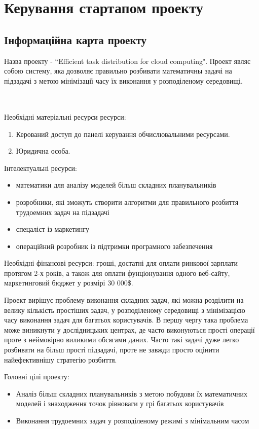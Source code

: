 \chapter{Керування стартапом проекту}
\section{Інформаційна карта проекту}
Назва проекту - ``Efficient task distribution for cloud computing". Проект являє собою систему, яка дозволяє правильно розбивати математичны задачі на підзадачі з метою мінімізації часу їх виконання у розподіленому середовищі.
\begin{tabular}
  {|l|p{8cm}|}
\hline

\end{tabular}
\\
Необхідні матеріальні ресурси ресурси:
\begin{enumerate}
\item Керований доступ до панелі керування обчислювальними ресурсами.
\item Юридична особа.
\end{enumerate}
Інтелектуальні ресурси:
\begin{itemize}
  \item математики для аналізу моделей більш складних планувальників
  \item розробники, які зможуть створити алгоритми для правильного розбиття трудоемних задач на підзадачі
  \item спецаліст із маркетингу
  \item операційний розробник із підтримки програмного забезпечення
\end{itemize}
Необхідні фінансові ресурси: гроші, достатні для оплати ринкової зарплати протягом 2-х років, а також для оплати фунціонування одного веб-сайту, маркетинговий бюджет у розмірі 30 000\$.

Проект вирішує проблему виконання складних задач, які можна розділити на велику кількість простіших задач, у розподіленому середовищі з мінімізацією часу виконання задач для багатьох користувачів. В першу чергу така проблема може виникнути у дослідницьких центрах, де часто виконуються прості операції проте з неймовірно виликими обсягами даних. Часто такі задачі дуже легко розбивати на більш прості підзадачі, проте не завжди просто оцінити найефективнішу стратегію розбиття.

Головні цілі проекту:
\begin{itemize}
  \item Аналіз більш складних планувальників з метою побудови їх математичних моделей і знаходження точок рівноваги у грі багатьох користувачів
  \item Виконання трудоемних задач у розподіленому режимі з мінімальним часом
\end{itemize}

